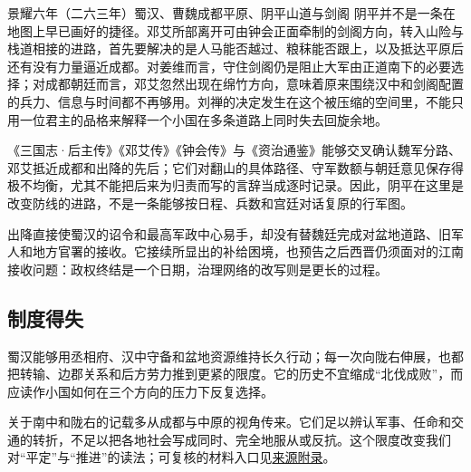 \begin{event}{}{景耀六年（二六三年）}{蜀汉、曹魏}{成都平原、阴平山道与剑阁}
阴平并不是一条在地图上早已画好的捷径。邓艾所部离开可由钟会正面牵制的剑阁方向，转入山险与栈道相接的进路，首先要解决的是人马能否越过、粮秣能否跟上，以及抵达平原后还有没有力量逼近成都。对姜维而言，守住剑阁仍是阻止大军由正道南下的必要选择；对成都朝廷而言，邓艾忽然出现在绵竹方向，意味着原来围绕汉中和剑阁配置的兵力、信息与时间都不再够用。刘禅的决定发生在这个被压缩的空间里，不能只用一位君主的品格来解释一个小国在多条道路上同时失去回旋余地。

\begin{sourcenote}[阴平的行军细节能说到哪里]
《三国志·后主传》《邓艾传》《钟会传》与《资治通鉴》能够交叉确认魏军分路、邓艾抵近成都和出降的先后；它们对翻山的具体路径、守军数额与朝廷意见保存得极不均衡，尤其不能把后来为归责而写的言辞当成逐时记录。因此，阴平在这里是改变防线的进路，不是一条能够按日程、兵数和宫廷对话复原的行军图。
\end{sourcenote}


出降直接使蜀汉的诏令和最高军政中心易手，却没有替魏廷完成对盆地道路、旧军人和地方官署的接收。它接续所显出的补给困境，也预告之后西晋仍须面对的江南接收问题：政权终结是一个日期，治理网络的改写则是更长的过程。
\end{event}

\subsection{制度得失}

蜀汉能够用丞相府、汉中守备和盆地资源维持长久行动；每一次向陇右伸展，也都把转输、边郡关系和后方劳力推到更紧的限度。它的历史不宜缩成“北伐成败”，而应读作小国如何在三个方向的压力下反复选择。

\begin{sourcenote}[南中与北伐不能画成一张平面图]
关于南中和陇右的记载多从成都与中原的视角传来。它们足以辨认军事、任命和交通的转折，不足以把各地社会写成同时、完全地服从或反抗。这个限度改变我们对“平定”与“推进”的读法；可复核的材料入口见\hyperref[app:sources]{来源附录}。
\end{sourcenote}
